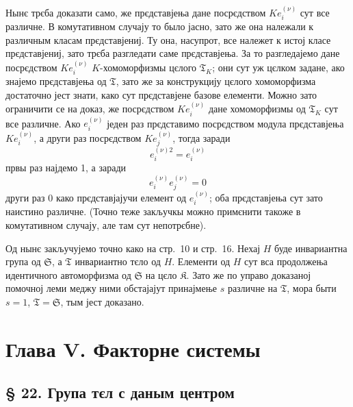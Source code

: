 \documentclass[11pt]{article}
\begin{document}
Нынє трєба доказати само, же прєдставјења дане посрєдством \(K e_i^{(\nu)}\) сут все различне. В комутативном случају то было јасно, зато же она належали к различным класам прєдставјениј. Ту она, насупрот, все належет к истој класе прєдставјениј, зато трєба разгледати саме прєдставјења. За то разгледајемо дане посрєдством \(K e_i^{(\nu)}\) \(K\)-хомоморфизмы цєлого \(\mathfrak T_K\); они сут уж цєлком задане, ако знајемо прєдставјења од \(\mathfrak T\), зато же за конструкцију цєлого хомоморфизма достаточно јест знати, како сут прєдставјене базове елементи. Можно зато ограничити се на доказ, же посрєдством \(K e_i^{(\nu)}\) дане хомоморфизмы од \(\mathfrak T_K\) сут все различне. Ако \(e_i^{(\nu)}\) једен раз прєдставимо посрєдством модула прєдставјења \(K e_i^{(\nu)}\), а други раз посрєдством \(K e_j^{(\nu)}\), тогда заради
\[
e_i^{(\nu)2}=e_i^{(\nu)}
\]
првы раз најдемо 1, а заради
\[
e_i^{(\nu)}e_j^{(\nu)}=0
\]
други раз 0 како прєдставјајучи елемент од \(e_i^{(\nu)}\); оба прєдставјења сут зато наистино различне. (Точно теже закључкы можно примєнити такоже в комутативном случају, але там сут непотрєбне).

Од нынє закључујемо точно како на стр.~10 и стр.~16. Нехај \(H\) буде инвариантна група од \(\mathfrak S\), а \(\mathfrak T\) инвариантно тєло од \(H\). Елементи од \(H\) сут вса продолжења идентичного автоморфизма од \(\mathfrak S\) на цєло \(\mathfrak K\). Зато же по управо доказаној помочној леми меджу ними обстајајут принајмење \(s\) различне на \(\mathfrak T\), мора быти \(s=1\), \(\mathfrak T=\mathfrak S\), тым јест доказано.

\section*{Глава V. Факторне системы}\label{kapitel-v.-faktorensysteme}

\subsection*{§ 22. Група тєл с даным центром}\label{die-gruppe-der-koerper-mit-gegebenem-zentrum}
\end{document}
